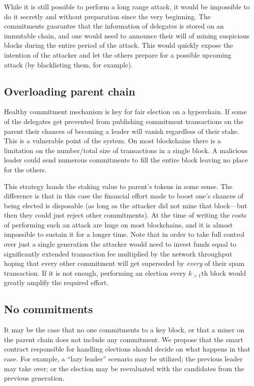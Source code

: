 While it is still possible to perform a long range attack, it would be
impossible to do it secretly and without preparation since the very beginning.
The commitments guarantee that the information of delegates is stored on an
immutable chain, and one would need to announce their will of mining suspicious
blocks during the entire period of the attack. This would quickly expose the
intention of the attacker and let the others prepare for a possible upcoming
attack (by blacklisting them, for example).

\subsection{Overloading parent chain}

Healthy commitment mechanism is key for fair election on a hyperchain. If some
of the delegates get prevented from publishing commitment transactions on the
parent their chances of becoming a leader will vanish regardless of their stake.
This is a vulnerable point of the system. On most blockchains there is a
limitation on the number/total size of transactions in a single block. A
malicious leader could send numerous commitments to fill the entire block
leaving no place for the others.

This strategy hands the staking value to parent's tokens in some sense. The
difference is that in this case the financial effort made to boost one's chances
of being elected is disposable (as long as the attacker did not mine that
block---but then they could just reject other commitments). At the time of
writing the costs of performing such an attack are huge on most blockchains, and
it is almost impossible to sustain it for a longer time. Note that in order to
take full control over just a single generation the attacker would need to
invest funds equal to significantly extended transaction fee multiplied by the
network throughput hoping that every other commitment will get superseded by
\textit{every} of their spam transaction. If it is not enough, performing an
election every $k_{> 1}$th block would greatly amplify the required effort.

\subsection{No commitments}

It may be the case that no one commitments to a key block, or that a miner on
the parent chain does not include any commitment. We propose that the smart
contract responsible for handling elections should decide on what happens in
that case. For example, a ``lazy leader'' scenario may be utilized; the
previous leader may take over; or the election may be reevaluated with the
candidates from the previous generation.
